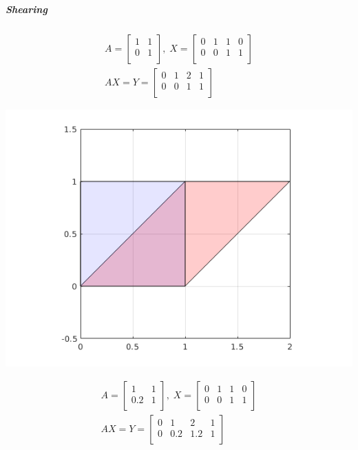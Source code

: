 \documentclass[MathsNotesBase.tex]{subfiles}
\begin{document}
{		\subparagraph{Shearing}
		\begin{align*}
		A =
		\begin{bmatrix}    
		1  &  1 \\
		0  &  1 \\		
		\end{bmatrix}
		,\; X = 
		\begin{bmatrix}  
		0   &  1  &   1  &   0 \\
		0   &  0  &   1  &   1	\\	
		\end{bmatrix} \\[10pt]
		AX = Y = 
		\begin{bmatrix}   
		0  &   1  &  2  &  1 \\
		0  &   0  &  1  &  1 \\
		\end{bmatrix}
		\end{align*}
	
		\begin{center}
		\includegraphics[scale=0.85]{resources/img/GeometryOfMatrices_images/shearing1.png}
		\end{center}
		
		\begin{align*}
		A =
		\begin{bmatrix}    
		1  &  1 \\
		0.2  &  1 \\		
		\end{bmatrix}
		,\; X = 
		\begin{bmatrix}  
		0   &  1  &   1  &   0 \\
		0   &  0  &   1  &   1	\\	
		\end{bmatrix} \\[10pt]
		AX = Y = 
		\begin{bmatrix}   
		0  &   1  &  2  &  1 \\
		0  &   0.2  &  1.2  &  1 \\
		\end{bmatrix}
		\end{align*}
	
}
\end{document}
